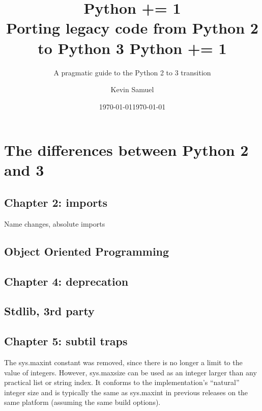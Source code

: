\documentclass[paperwidth=8in, paperheight=10in,lang=en]{elegantbook}
\title{
  Python += 1 \\
  \large Porting legacy code from Python 2 to Python 3
}
\title{Python += 1}
\subtitle{A pragmatic guide to the Python 2 to 3 transition}
\institute{Bite Code}
\date{\today}
\author{Kevin Samuel}
\date{\today}
\begin{document}
\maketitle

\frontmatter

\tableofcontents



\mainmatter

\hypersetup{pageanchor=true}

\part{The differences between Python 2 and 3}







\chapter{Chapter 2: imports}

Name changes, absolute imports




\chapter{Object Oriented Programming}\label{chap:oop}

\chapter{Chapter 4: deprecation}

\chapter{Stdlib, 3rd party}

\chapter{Chapter 5: subtil traps}

The sys.maxint constant was removed, since there is no longer a limit to the value of integers. However, sys.maxsize can be used as an integer larger than any practical list or string index. It conforms to the implementation’s “natural” integer size and is typically the same as sys.maxint in previous releases on the same platform (assuming the same build options).
\end{document}
